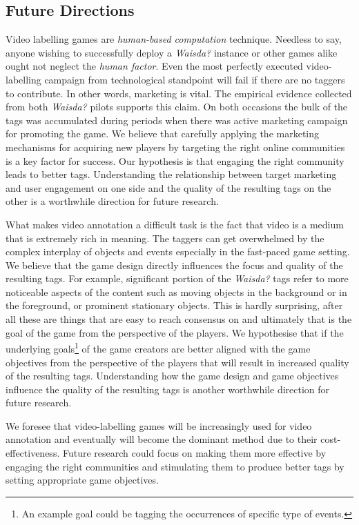 \subsection{Future Directions}
Video labelling games are \textit{human-based computation} technique. Needless to say, anyone wishing to successfully deploy a \textit{Waisda?} instance or other games alike ought not neglect the \textit{human factor}. Even the most perfectly executed video-labelling campaign from technological standpoint will fail if there are no taggers to contribute. In other words, marketing is vital. The empirical evidence collected from both \textit{Waisda?} pilots supports this claim. On both occasions the bulk of the tags was accumulated during periods when there was active marketing campaign for promoting the game. We believe that carefully applying the marketing mechanisms for acquiring new players by targeting the right online communities is a key factor for success. Our hypothesis is that engaging the right community leads to better tags. Understanding the relationship between target marketing and user engagement on one side and the quality of the resulting tags on the other is a worthwhile direction for future research.

What makes video annotation a difficult task is the fact that video is a medium that is extremely rich in meaning. The taggers can get overwhelmed by the complex interplay of objects and events especially in the fast-paced game setting. We believe that the game design directly influences the focus and quality of the resulting tags. For example, significant portion of the \textit{Waisda?} tags refer to more noticeable aspects of the content such as moving objects in the background or in the foreground, or prominent stationary objects. This is hardly surprising, after all these are things that are easy to reach consensus on and ultimately that is the goal of the game from the perspective of the players. We hypothesise that if the underlying goals\footnote{An example goal could be tagging the occurrences of specific type of events.} of the game creators are better aligned with the game objectives from the perspective of the players that will result in increased quality of the resulting tags. Understanding how the game design and game objectives influence the quality of the resulting tags is another worthwhile direction for future research. 

We foresee that video-labelling games will be increasingly used for video annotation and eventually will become the dominant method due to their cost-effectiveness. Future research could focus on making them more effective by engaging the right communities and stimulating them to produce better tags by setting appropriate game objectives.  



 